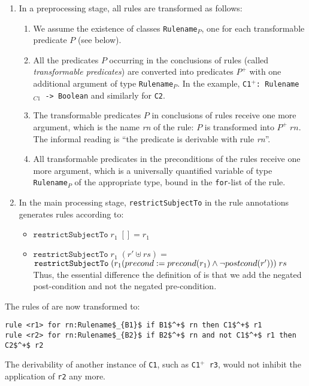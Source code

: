 \begin{enumerate}
\item In a preprocessing stage, all rules are transformed as follows:
  \begin{enumerate}
  \item We assume the existence of classes \texttt{Rulename$_P$}, one for each
    transformable predicate $P$ (see below).
  \item All the predicates $P$
    occurring in the conclusions of rules (called \emph{transformable
      predicates}) are converted into predicates $P^+$ with one additional
    argument of type \texttt{Rulename$_P$}. In the
    example, \texttt{C1$^+$: Rulename$_{C1}$ -> Boolean} and similarly for \texttt{C2}.
  \item The transformable predicates $P$ in conclusions of rules receive one
    more argument, which is the name \emph{rn} of the rule: $P$ is transformed
    into $P^+\; rn$. The informal reading is ``the predicate is derivable with
    rule \emph{rn}''.
  \item All transformable predicates in the preconditions of the rules receive
    one more argument, which is a universally quantified variable of type
    \texttt{Rulename$_P$} of the appropriate type, bound in the
    \texttt{for}-list of the rule.
  \end{enumerate}
\item In the main processing stage, \texttt{restrictSubjectTo} in the rule
  annotations generates rules according to:
  \begin{itemize}
\item $\mathtt{restrictSubjectTo}\; r_1\; [] = r_1$
\item $\mathtt{restrictSubjectTo}\; r_1\; (r' \uplus rs) =$\\
  $\mathtt{restrictSubjectTo}\; (r_1(precond := precond(r_1) \land \lnot postcond(r')))\; rs$
  Thus, the essential difference \wrt{} the definition of
   is that we add the negated post-condition and not
  the negated pre-condition.
\end{itemize}
\end{enumerate}

\begin{example} The rules of  are now
  transformed to:
\begin{lstlisting}[mathescape=true]
rule <r1> for rn:Rulename$_{B1}$ if B1$^+$ rn then C1$^+$ r1
rule <r2> for rn:Rulename$_{B2}$ if B2$^+$ rn and not C1$^+$ r1 then C2$^+$ r2
\end{lstlisting}
The derivability of another instance of \texttt{C1}, such as \texttt{C1$^+$ r3},
would not inhibit the application of \texttt{r2} any more.
\end{example}


